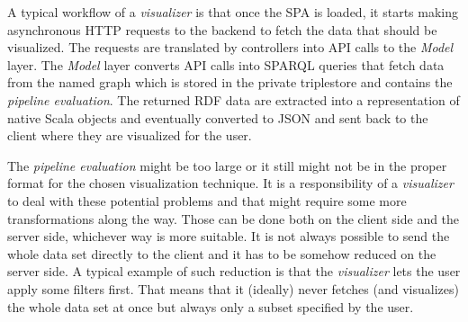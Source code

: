 A typical workflow of a \emph{visualizer} is that once the SPA is loaded, it starts making asynchronous HTTP requests to the backend to fetch the data that should be visualized. The requests are translated by controllers into API calls to the \emph{Model} layer.  The \emph{Model} layer converts API calls into SPARQL queries that fetch data from the named graph which is stored in the private triplestore and contains the \emph{pipeline evaluation}. The returned RDF data are extracted into a representation of native Scala objects and eventually converted to JSON and sent back to the client where they are visualized for the user.

The \emph{pipeline evaluation} might be too large or it still might not be in the proper format for the chosen visualization technique. It is a responsibility of a \emph{visualizer} to deal with these potential problems and that might require some more transformations along the way. Those can be done both on the client side and the server side, whichever way is more suitable. It is not always possible to send the whole data set directly to the client and it has to be somehow reduced on the server side. A typical example of such reduction is that the \emph{visualizer} lets the user apply some filters first. That means that it (ideally) never fetches (and visualizes) the whole data set at once but always only a subset specified by the user. 